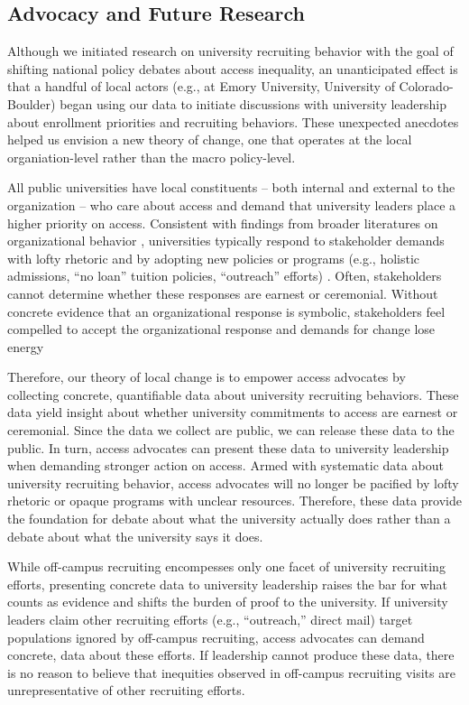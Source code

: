 \documentclass[twoside]{article}
\begin{document}
\subsection*{Advocacy and Future Research}

Although we initiated research on university recruiting behavior with the goal of shifting national policy debates about access inequality, an unanticipated effect is that a handful of local actors (e.g., at Emory University, University of Colorado-Boulder) began using our data to initiate discussions with university leadership about enrollment priorities and recruiting behaviors.  These unexpected anecdotes helped us envision a new theory of change, one that operates at the local organiation-level rather than the macro policy-level.

All public universities have local constituents -- both internal and external to the organization -- who care about access and demand that university leaders place a higher priority on access.  Consistent with findings from broader literatures on organizational behavior \citep{RN2436}, universities typically respond to stakeholder demands with lofty rhetoric and by adopting new policies or programs (e.g., holistic admissions, ``no loan'' tuition policies, ``outreach'' efforts) \citep[e.g., ][]{RN4017}.  Often, stakeholders cannot determine whether these responses are earnest or ceremonial. Without concrete evidence that an organizational response is symbolic, stakeholders feel compelled to accept the organizational response and demands for change lose energy

Therefore, our theory of local change is to empower access advocates by collecting concrete, quantifiable data about university recruiting behaviors. These data yield insight about whether university commitments to access are earnest or ceremonial.  Since the data we collect are public, we can release these data to the public. In turn, access advocates can present these data to university leadership when demanding stronger action on access.  Armed with systematic data about university recruiting behavior, access advocates will no longer be pacified by lofty rhetoric or opaque programs with unclear resources.  Therefore, these data provide the foundation for debate about what the university actually does rather than a debate about what the university says it does.

While off-campus recruiting encompesses only one facet of university recruiting efforts, presenting concrete data to university leadership raises the bar for what counts as evidence and shifts the burden of proof to the university. If university leaders claim other recruiting efforts (e.g., ``outreach,''  direct mail) target populations ignored by off-campus recruiting, access advocates can demand concrete, data about these efforts. If leadership cannot produce these data, there is no reason to believe that inequities observed in off-campus recruiting visits are unrepresentative of other recruiting efforts. 
\end{document}
